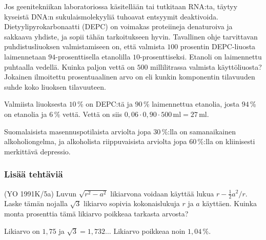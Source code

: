 \begin{tehtavasivu}
\begin{tehtava}
Jos geenitekniikan laboratoriossa käsitellään tai tutkitaan RNA:ta, täytyy kyseistä DNA:n sukulaismolekyyliä tuhoavat entsyymit deaktivoida. Dietyylipyrokarbonaatti (DEPC) on voimakas proteiineja denaturoiva ja sakkaava yhdiste, ja sopii tähän tarkoitukseen hyvin. Tavallinen ohje tarvittavan puhdistusliuoksen valmistamiseen on, että valmista $100$ prosentin DEPC-liuosta laimennetaan $94$-prosenttisella etanolilla $10$-prosenttiseksi. Etanoli on laimennettu puhtaalla vedellä. Kuinka paljon vettä on $500$ millilitrassa valmista käyttöliuosta? Jokainen ilmoitettu prosentuaalinen arvo on  eli kunkin komponentin tilavuuden suhde koko liuoksen tilavuuteen.
	\begin{vastaus}
	Valmiista liuoksesta $10\,$\% on DEPC:tä ja $90\,$\% laimennettua etanolia, josta $94\,$\% on etanolia ja $6$\,\% vettä. Vettä on siis $0,06\cdot0,90\cdot500$\,ml$=27$\,ml.
	\end{vastaus}
\end{tehtava}

\begin{tehtava}
Suomalaisista masennuspotilaista arviolta jopa $30$\,\%:lla on samanaikainen alkoholiongelma, ja alkoholista riippuvaisista arviolta jopa $60$\,\%:lla on kliinisesti merkittävä depressio.
	\begin{vastaus}
	\end{vastaus}
\end{tehtava}

\subsubsection*{Lisää tehtäviä}

\begin{tehtava}
    (YO 1991K/5a) Luvun $\sqrt{r^2-a^2}$ likiarvona voidaan käyttää lukua $r-{\frac{1}{2}a^2}/r$. Laske tämän nojalla $\sqrt{3}$ likiarvo sopivia kokonaislukuja $r$ ja $a$ käyttäen. Kuinka monta prosenttia tämä likiarvo poikkeaa tarkasta arvosta?
    \begin{vastaus}
        Likiarvo on $1,75$ ja $\sqrt{3}=1,732\ldots$ Likiarvo poikkeaa noin $1,04\,\%$.
    \end{vastaus}
\end{tehtava}


\end{tehtavasivu}
